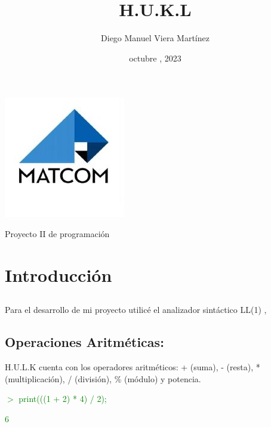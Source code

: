 \documentclass[a4paper,12pt]{article}
\begin{document}
    \ttfamily
    \title{\huge \textbf{H.U.K.L}}
    \author{Diego Manuel Viera Martínez}
    \date{octubre , 2023}
    \maketitle
    \begin{center}
        \includegraphics[scale=0.7]{Pictures/matcom.jpg}
        \label{fig:logo}
    \end{center}
    \begin{center}
        \large Proyecto II de programación
    \end{center}

    \newpage 
    
    \section{Introducción}\label{sec:lexerclass}\subsection{}\label{sub:printExpression}
    \begin{center}
        Para el desarrollo de mi proyecto utilicé el analizador sintáctico LL(1) , 
    \end{center}
    
    \subsection{Operaciones Aritméticas:}\label{sub:aritmeticsOperations}
    \begin{flushleft}
        H.U.L.K cuenta con los operadores aritméticos: + (suma),  - (resta), 
        * (multiplicación), / (división), \% (módulo) y potencia.
    \end{flushleft}
    \textcolor{green}{$>$ print(((1 + 2) * 4) / 2);}
    
    \textcolor{green}{6}
\end{document}
